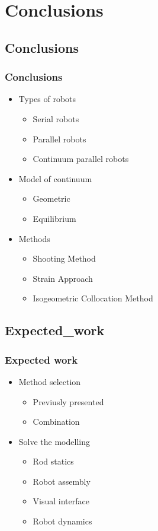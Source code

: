 \documentclass[compress]{thesisbeamer}
\begin{document}
  	\section{Conclusions}
      	\subsection{Conclusions}
        \begin{frame}
        	\frametitle{Conclusions}
        	\begin{itemize}
        		\item Types of robots
        		\begin{itemize}
        			\item Serial robots
        			\item Parallel robots
        			\item Continuum parallel robots
        		\end{itemize}
        		\item Model of continuum
       		 	\begin{itemize}
        			\item Geometric
        			\item Equilibrium
        		\end{itemize}
        		\item Methods
        		\begin{itemize}
        			\item Shooting Method
       		 		\item Strain Approach
       		 		\item Isogeometric Collocation Method
        		\end{itemize}
        	\end{itemize}
        \end{frame}
        	
      	\subsection{Expected_work}
        \begin{frame}
        	\frametitle{Expected work}
        	\begin{itemize}
        		\item Method selection
        		\begin{itemize}
        			\item Previusly presented 
        			\item Combination
        		\end{itemize}
        		\item Solve the modelling
  				\begin{itemize}%
   					\item Rod statics
   					\item Robot assembly
   					\item Visual interface
   					\item Robot dynamics
  				\end{itemize}
        	\end{itemize}
        \end{frame}
        	
\end{document}
